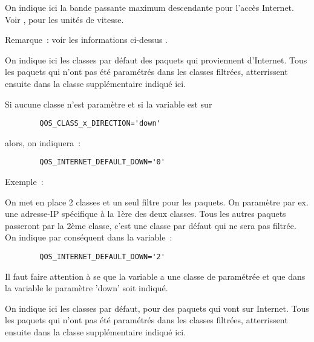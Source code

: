 \begin{description}

    On indique ici la bande passante maximum descendante pour l'accès
    Internet. Voir , pour les unités de vitesse.

    Remarque~: voir les informations ci-dessus .


    On indique ici les classes par défaut des paquets qui proviennent d'Internet.
    Tous les paquets qui n'ont pas été paramétrés dans les classes filtrées,
    atterrissent ensuite dans la classe supplémentaire indiqué ici.

    Si aucune classe n'est paramètre et si la variable est sur
\begin{example}
\begin{verbatim}
        QOS_CLASS_x_DIRECTION='down'
\end{verbatim}
\end{example}
    alors, on indiquera~:
\begin{example}
\begin{verbatim}
        QOS_INTERNET_DEFAULT_DOWN='0'
\end{verbatim}
\end{example}

    Exemple~:

    On met en place 2 classes et un seul filtre pour les paquets. On paramètre
    par ex. une adresse-IP spécifique à la 1ère des deux classes. Tous les autres
    paquets passeront par la 2ème classe, c'est une classe par défaut qui ne sera
    pas filtrée. On indique par conséquent dans la variable~:

\begin{example}
\begin{verbatim}
        QOS_INTERNET_DEFAULT_DOWN='2'
\end{verbatim}
\end{example}

    Il faut faire attention à se que la variable 
    a une classe de paramétrée et que dans la variable 
    le paramètre 'down' soit indiqué.


    On indique ici les classes par défaut, pour des paquets qui vont sur
    Internet. Tous les paquets qui n'ont pas été paramétrés dans les classes
    filtrées, atterrissent ensuite dans la classe supplémentaire indiqué ici.


\end{description}
